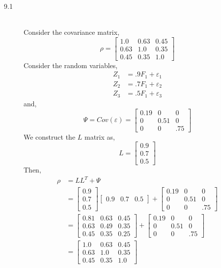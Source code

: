\documentclass[letterpaper,10pt]{article}
\begin{document}
\begin{description}
\item[9.1]\hfill\\
Consider the covariance matrix,
\[\rho=\begin{bmatrix}
1.0 & 0.63 & 0.45\\0.63 & 1.0 & 0.35\\0.45 & 0.35 & 1.0 
\end{bmatrix} \]
Consider the random variables,
\begin{align*}
Z_1 &= .9F_1+\varepsilon_1\\
Z_2 &= .7F_1+\varepsilon_2\\
Z_3 &= .5F_1+\varepsilon_3
\end{align*}
and,
\[\Psi=Cov(\varepsilon )=\begin{bmatrix}
0.19 & 0 & 0\\
0 & 0.51 & 0\\
0 & 0 & .75
\end{bmatrix} \]
We construct the $L$ matrix as,
\[L=\begin{bmatrix}
0.9\\0.7\\0.5
\end{bmatrix} \]
Then,
\begin{align*}
\rho &= LL^T+\Psi\\
&=\begin{bmatrix}
0.9\\0.7\\0.5
\end{bmatrix} \begin{bmatrix}
0.9 & 0.7 & 0.5
\end{bmatrix}+\begin{bmatrix}
0.19 & 0 & 0\\
0 & 0.51 & 0\\
0 & 0 & .75
\end{bmatrix}\\
&=\begin{bmatrix}
0.81 & 0.63 & 0.45\\ 0.63 & 0.49 & 0.35\\ 0.45 & 0.35 & 0.25
\end{bmatrix}+\begin{bmatrix}
0.19 & 0 & 0\\
0 & 0.51 & 0\\
0 & 0 & .75
\end{bmatrix}\\
&=\begin{bmatrix}
1.0 & 0.63 & 0.45\\0.63 & 1.0 & 0.35\\0.45 & 0.35 & 1.0 

\end{bmatrix}
\end{align*}
\end{description}
\end{document}
